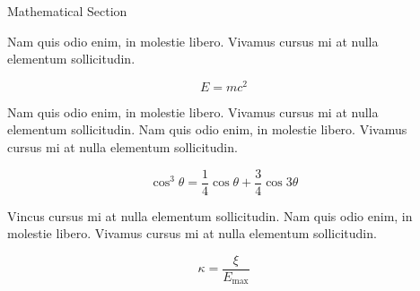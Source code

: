 \documentclass[final]{beamer}
\newlength{\onecolwid}
\newlength{\twocolwid}
\begin{document}
\begin{frame}[t]
\begin{columns}[t]
\begin{column}{\twocolwid}
\begin{columns}[t,totalwidth=\twocolwid]
        \begin{column}{\onecolwid} %


          \begin{block}{Mathematical Section}

            Nam quis odio enim, in molestie libero. Vivamus cursus mi at nulla elementum
            sollicitudin.

            \begin{equation}
              E = mc^{2}
              \label{eqn:Einstein}
            \end{equation}

            Nam quis odio enim, in molestie libero. Vivamus cursus mi at nulla elementum
            sollicitudin. Nam quis odio enim, in molestie libero. Vivamus cursus mi at nulla
            elementum sollicitudin.

            \begin{equation}
              \cos^3 \theta =\frac{1}{4}\cos\theta+\frac{3}{4}\cos 3\theta
              \label{eq:refname}
            \end{equation}

            Vincus cursus mi at nulla elementum sollicitudin. Nam quis odio
            enim, in molestie libero. Vivamus cursus mi at nulla elementum
            sollicitudin.

            \begin{equation}
              \kappa =\frac{\xi}{E_{\mathrm{max}}} %
            \end{equation}

          \end{block}


        \end{column} %

        \begin{column}{\onecolwid} %



\end{column}
\end{columns}
\end{column}
\end{columns}
\end{frame}
\end{document}
